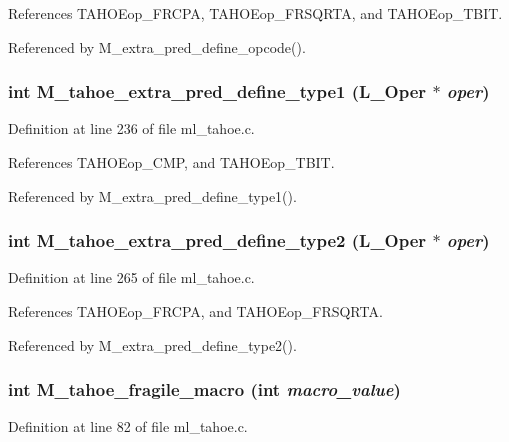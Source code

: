 References TAHOEop\_\-FRCPA, TAHOEop\_\-FRSQRTA, and TAHOEop\_\-TBIT.

Referenced by M\_\-extra\_\-pred\_\-define\_\-opcode().
\subsubsection{\setlength{\rightskip}{0pt plus 5cm}int M\_\-tahoe\_\-extra\_\-pred\_\-define\_\-type1 (L\_\-Oper $\ast$ {\em oper})}\label{ml__tahoe_8c_ddc3a83460fdf44afca3dc9db9238f5c}




Definition at line 236 of file ml\_\-tahoe.c.

References TAHOEop\_\-CMP, and TAHOEop\_\-TBIT.

Referenced by M\_\-extra\_\-pred\_\-define\_\-type1().
\subsubsection{\setlength{\rightskip}{0pt plus 5cm}int M\_\-tahoe\_\-extra\_\-pred\_\-define\_\-type2 (L\_\-Oper $\ast$ {\em oper})}\label{ml__tahoe_8c_6449b48c1c2b94ed0ebf892eb83e4257}




Definition at line 265 of file ml\_\-tahoe.c.

References TAHOEop\_\-FRCPA, and TAHOEop\_\-FRSQRTA.

Referenced by M\_\-extra\_\-pred\_\-define\_\-type2().
\subsubsection{\setlength{\rightskip}{0pt plus 5cm}int M\_\-tahoe\_\-fragile\_\-macro (int {\em macro\_\-value})}\label{ml__tahoe_8c_648bb0854785bf93d3d79a87aa8dd06b}




Definition at line 82 of file ml\_\-tahoe.c.

